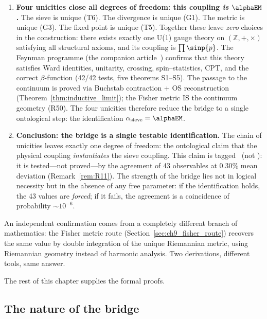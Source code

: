 \documentclass[12pt,a4paper]{article}
\begin{document}
\begin{tcolorbox}[colback=thmblue!5, colframe=thmblue!60, title={\textbf{The argument in five steps}}]
\begin{enumerate}[leftmargin=*, label=\textbf{\arabic*.}]
\item \textbf{Four unicities close all degrees of freedom: this coupling
  \emph{is} $\alphaEM$.}
  The sieve is unique (T6). The divergence is unique (G1). The metric is
  unique (G3). The fixed point is unique (T5). Together these leave
  \emph{zero} choices in the construction: there exists exactly one U(1)
  gauge theory on $(\mathbb{Z}, +, \times)$ satisfying all structural
  axioms, and its coupling is $\prod \sinp{p}$.  The Feynman programme
  (the companion article~\cite{companion_physics}) confirms that this theory satisfies Ward identities, unitarity,
  crossing, spin--statistics, CPT, and the correct $\beta$-function
  (42/42 tests, five theorems S1--S5).  The passage to the continuum
  is proved via Buchstab contraction + OS reconstruction
  (Theorem~\ref{thm:inductive_limit}); the Fisher metric IS the continuum
  geometry (R50).  The four unicities therefore reduce the bridge to a single
  ontological step: the identification $\alpha_{\rm sieve} = \alphaEM$.

\item \textbf{Conclusion: the bridge is a single testable identification.}
  The chain of unicities leaves exactly one degree of freedom: the
  ontological claim that the physical coupling \emph{instantiates}
  the sieve coupling.  This claim is tagged \BRIDGETAG\ (not \THMTAG):
  it is tested---not proved---by the agreement of 43 observables at
  $0.30\%$ mean deviation (Remark~\ref{rem:R11}).
  The strength of the bridge lies not in logical necessity but in the
  absence of any free parameter: if the identification holds, the
  43 values are \emph{forced}; if it fails, the agreement is
  a coincidence of probability $\sim 10^{-6}$.
\end{enumerate}
\end{tcolorbox}

\medskip\noindent
An independent confirmation comes from a completely different branch of
mathematics: the Fisher metric route (Section~\ref{sec:ch9_fisher_route})
recovers the same value by double integration of the unique Riemannian
metric, using Riemannian geometry instead of harmonic analysis.  Two
derivations, different tools, same answer.

\medskip\noindent
The rest of this chapter supplies the formal proofs.

\subsection{The nature of the bridge}
\label{sec:ch9_intuition}
\end{document}
